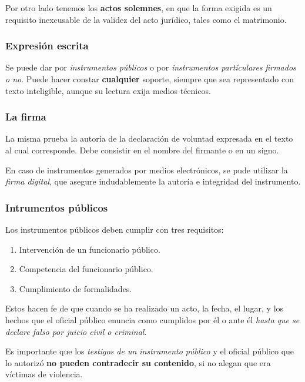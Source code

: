 \documentclass[../main.tex]{subfiles}
\begin{document}
Por otro lado tenemos los \textbf{actos solemnes}, en que la forma exigida es 
un requisito inexcusable de la validez del acto jurídico, tales como el matrimonio.

\subsubsection{Expresión escrita}

Se puede dar por \textit{instrumentos públicos} o por \textit{instrumentos partículares}
\textit{firmados o no}. Puede hacer constar \textbf{cualquier} soporte, siempre
que sea representado con texto inteligible, aunque su lectura exija medios técnicos.

\subsubsection{La firma}

La misma prueba la autoría de la declaración de voluntad expresada en el texto al
cual corresponde. Debe consistir en el nombre del firmante o en un signo.

En caso de instrumentos generados por medios electrónicos, se pude utilizar la
\textit{firma digital}, que asegure indudablemente la autoría e integridad del
instrumento.

\subsubsection{Intrumentos públicos}

Los instrumentos públicos deben cumplir con tres requisitos: 

\begin{enumerate}
  \item Intervención de un funcionario público.
  \item Competencia del funcionario público.
  \item Cumplimiento de formalidades.
\end{enumerate}

Estos hacen fe de que cuando se ha realizado un acto, la fecha, el lugar, y los
hechos que el oficial público enuncia como cumplidos por él o ante él \textit{hasta}
\textit{que se declare falso por juicio civil o criminal}.

Es importante que los \textit{testigos de un instrumento público} y el oficial
público que lo autorizó \textbf{no pueden contradecir su contenido}, si no alegan
que era víctimas de violencia.
\end{document}
